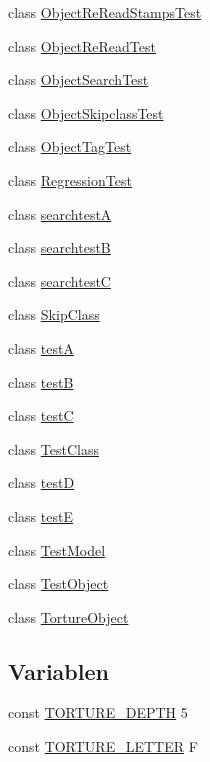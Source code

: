 \begin{DoxyCompactItemize}
\item 
class \hyperlink{classTests_1_1Feature_1_1ObjectReReadStampsTest}{Object\+Re\+Read\+Stamps\+Test}
\item 
class \hyperlink{classTests_1_1Feature_1_1ObjectReReadTest}{Object\+Re\+Read\+Test}
\item 
class \hyperlink{classTests_1_1Feature_1_1ObjectSearchTest}{Object\+Search\+Test}
\item 
class \hyperlink{classTests_1_1Feature_1_1ObjectSkipclassTest}{Object\+Skipclass\+Test}
\item 
class \hyperlink{classTests_1_1Feature_1_1ObjectTagTest}{Object\+Tag\+Test}
\item 
class \hyperlink{classTests_1_1Feature_1_1RegressionTest}{Regression\+Test}
\item 
class \hyperlink{classTests_1_1Feature_1_1searchtestA}{searchtestA}
\item 
class \hyperlink{classTests_1_1Feature_1_1searchtestB}{searchtestB}
\item 
class \hyperlink{classTests_1_1Feature_1_1searchtestC}{searchtestC}
\item 
class \hyperlink{classTests_1_1Feature_1_1SkipClass}{Skip\+Class}
\item 
class \hyperlink{classTests_1_1Feature_1_1testA}{testA}
\item 
class \hyperlink{classTests_1_1Feature_1_1testB}{testB}
\item 
class \hyperlink{classTests_1_1Feature_1_1testC}{testC}
\item 
class \hyperlink{classTests_1_1Feature_1_1TestClass}{Test\+Class}
\item 
class \hyperlink{classTests_1_1Feature_1_1testD}{testD}
\item 
class \hyperlink{classTests_1_1Feature_1_1testE}{testE}
\item 
class \hyperlink{classTests_1_1Feature_1_1TestModel}{Test\+Model}
\item 
class \hyperlink{classTests_1_1Feature_1_1TestObject}{Test\+Object}
\item 
class \hyperlink{classTests_1_1Feature_1_1TortureObject}{Torture\+Object}
\end{DoxyCompactItemize}
\subsection*{Variablen}
\begin{DoxyCompactItemize}
\item 
const \hyperlink{namespaceTests_1_1Feature_a217c52b95d64a06b516e533ef4fe6f00}{T\+O\+R\+T\+U\+R\+E\+\_\+\+D\+E\+P\+TH} 5
\item 
const \hyperlink{namespaceTests_1_1Feature_ab37f2eaa91f55904890cf8851dfee554}{T\+O\+R\+T\+U\+R\+E\+\_\+\+L\+E\+T\+T\+ER} \textquotesingle{}F\textquotesingle{}
\end{DoxyCompactItemize}


